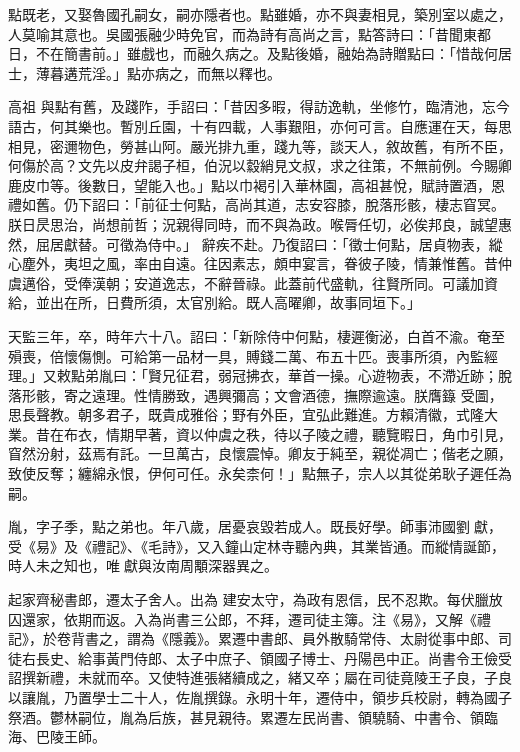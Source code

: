 \begin{pinyinscope}
 點既老，又娶魯國孔嗣女，嗣亦隱者也。點雖婚，亦不與妻相見，築別室以處之，人莫喻其意也。吳國張融少時免官，而為詩有高尚之言，點答詩曰：「昔聞東都日，不在簡書前。」雖戲也，而融久病之。及點後婚，融始為詩贈點曰：「惜哉何居士，薄暮遘荒淫。」點亦病之，而無以釋也。



 高祖
 與點有舊，及踐阼，手詔曰：「昔因多暇，得訪逸軌，坐修竹，臨清池，忘今語古，何其樂也。暫別丘園，十有四載，人事艱阻，亦何可言。自應運在天，每思相見，密邇物色，勞甚山阿。嚴光排九重，踐九等，談天人，敘故舊，有所不臣，何傷於高？文先以皮弁謁子桓，伯況以縠綃見文叔，求之往策，不無前例。今賜卿鹿皮巾等。後數日，望能入也。」點以巾褐引入華林園，高祖甚悅，賦詩置酒，恩禮如舊。仍下詔曰：「前征士何點，高尚其道，志安容膝，脫落形骸，棲志窅冥。朕日昃思治，尚想前哲；況親得同時，而不與為政。喉脣任切，必俟邦良，誠望惠然，屈居獻替。可徵為侍中。」
 辭疾不赴。乃復詔曰：「徵士何點，居貞物表，縱心塵外，夷坦之風，率由自遠。往因素志，頗申宴言，眷彼子陵，情兼惟舊。昔仲虞邁俗，受俸漢朝；安道逸志，不辭晉祿。此蓋前代盛軌，往賢所同。可議加資給，並出在所，日費所須，太官別給。既人高曜卿，故事同垣下。」



 天監三年，卒，時年六十八。詔曰：「新除侍中何點，棲遲衡泌，白首不渝。奄至殞喪，倍懷傷惻。可給第一品材一具，賻錢二萬、布五十匹。喪事所須，內監經理。」又敕點弟胤曰：「賢兄征君，弱冠拂衣，華首一操。心遊物表，不滯近跡；脫落形骸，寄之遠理。性情勝致，遇興彌高；文會酒德，撫際逾遠。朕膺籙
 受圖，思長聲教。朝多君子，既貴成雅俗；野有外臣，宜弘此難進。方賴清徽，式隆大業。昔在布衣，情期早著，資以仲虞之秩，待以子陵之禮，聽覽暇日，角巾引見，窅然汾射，茲焉有託。一旦萬古，良懷震悼。卿友于純至，親從凋亡；偕老之願，致使反奪；纏綿永恨，伊何可任。永矣柰何！」點無子，宗人以其從弟耿子遲任為嗣。



 胤，字子季，點之弟也。年八歲，居憂哀毀若成人。既長好學。師事沛國劉獻，受《易》及《禮記》、《毛詩》，又入鐘山定林寺聽內典，其業皆通。而縱情誕節，時人未之知也，唯獻與汝南周顒深器異之。



 起家齊秘書郎，遷太子舍人。出為
 建安太守，為政有恩信，民不忍欺。每伏臘放囚還家，依期而返。入為尚書三公郎，不拜，遷司徒主簿。注《易》，又解《禮記》，於卷背書之，謂為《隱義》。累遷中書郎、員外散騎常侍、太尉從事中郎、司徒右長史、給事黃門侍郎、太子中庶子、領國子博士、丹陽邑中正。尚書令王儉受詔撰新禮，未就而卒。又使特進張緒續成之，緒又卒；屬在司徒竟陵王子良，子良以讓胤，乃置學士二十人，佐胤撰錄。永明十年，遷侍中，領步兵校尉，轉為國子祭酒。鬱林嗣位，胤為后族，甚見親待。累遷左民尚書、領驍騎、中書令、領臨海、巴陵王師。




\end{pinyinscope}
